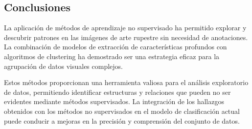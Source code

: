 \subsection{Conclusiones}

La aplicación de métodos de aprendizaje no supervisado ha permitido explorar y descubrir patrones en las imágenes de arte rupestre sin necesidad de anotaciones. La combinación de modelos de extracción de características profundos con algoritmos de clustering ha demostrado ser una estrategia eficaz para la agrupación de datos visuales complejos.

Estos métodos proporcionan una herramienta valiosa para el análisis exploratorio de datos, permitiendo identificar estructuras y relaciones que pueden no ser evidentes mediante métodos supervisados. La integración de los hallazgos obtenidos con los métodos no supervisados en el modelo de clasificación actual puede conducir a mejoras en la precisión y comprensión del conjunto de datos.

\newpage

%
%
%

